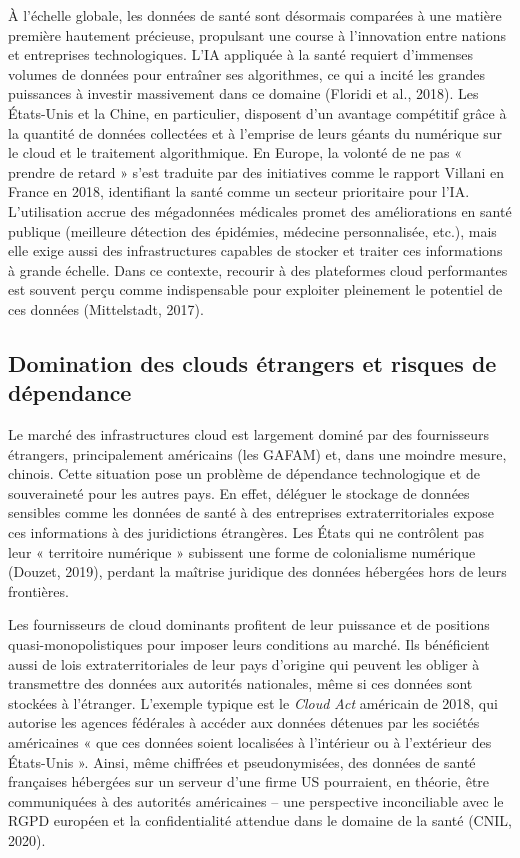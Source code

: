 \documentclass[10pt,a4paper]{article} %
\begin{document}
À l’échelle globale, les données de santé sont désormais comparées à une matière première hautement précieuse, propulsant une course à l’innovation entre nations et entreprises technologiques. L’IA appliquée à la santé requiert d’immenses volumes de données pour entraîner ses algorithmes, ce qui a incité les grandes puissances à investir massivement dans ce domaine (Floridi et al., 2018). Les États-Unis et la Chine, en particulier, disposent d’un avantage compétitif grâce à la quantité de données collectées et à l’emprise de leurs géants du numérique sur le cloud et le traitement algorithmique. En Europe, la volonté de ne pas « prendre de retard » s’est traduite par des initiatives comme le rapport Villani en France en 2018, identifiant la santé comme un secteur prioritaire pour l’IA. L’utilisation accrue des mégadonnées médicales promet des améliorations en santé publique (meilleure détection des épidémies, médecine personnalisée, etc.), mais elle exige aussi des infrastructures capables de stocker et traiter ces informations à grande échelle. Dans ce contexte, recourir à des plateformes cloud performantes est souvent perçu comme indispensable pour exploiter pleinement le potentiel de ces données (Mittelstadt, 2017).

\subsection{Domination des clouds étrangers et risques de dépendance}

Le marché des infrastructures cloud est largement dominé par des fournisseurs étrangers, principalement américains (les GAFAM) et, dans une moindre mesure, chinois. Cette situation pose un problème de dépendance technologique et de souveraineté pour les autres pays. En effet, déléguer le stockage de données sensibles comme les données de santé à des entreprises extraterritoriales expose ces informations à des juridictions étrangères. Les États qui ne contrôlent pas leur « territoire numérique » subissent une forme de colonialisme numérique (Douzet, 2019), perdant la maîtrise juridique des données hébergées hors de leurs frontières.

Les fournisseurs de cloud dominants profitent de leur puissance et de positions quasi-monopolistiques pour imposer leurs conditions au marché. Ils bénéficient aussi de lois extraterritoriales de leur pays d’origine qui peuvent les obliger à transmettre des données aux autorités nationales, même si ces données sont stockées à l’étranger. L’exemple typique est le \textit{Cloud Act} américain de 2018, qui autorise les agences fédérales à accéder aux données détenues par les sociétés américaines « que ces données soient localisées à l’intérieur ou à l’extérieur des États-Unis ». Ainsi, même chiffrées et pseudonymisées, des données de santé françaises hébergées sur un serveur d’une firme US pourraient, en théorie, être communiquées à des autorités américaines – une perspective inconciliable avec le RGPD européen et la confidentialité attendue dans le domaine de la santé (CNIL, 2020).
\end{document}
